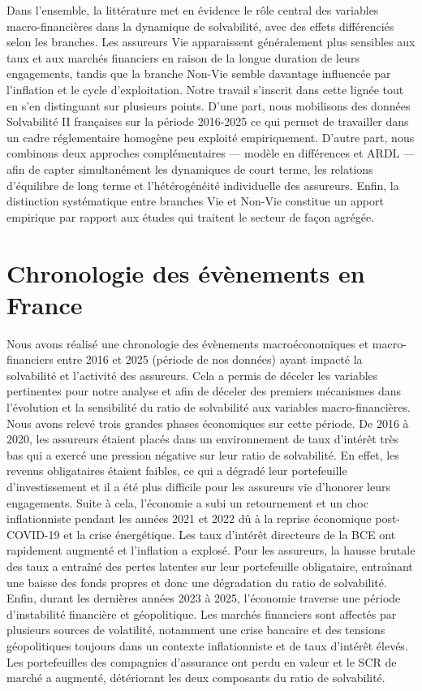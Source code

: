 \documentclass[
]{article}
\begin{document}
Dans l'ensemble, la littérature met en évidence le rôle central des
variables macro-financières dans la dynamique de solvabilité, avec des
effets différenciés selon les branches. Les assureurs Vie apparaissent
généralement plus sensibles aux taux et aux marchés financiers en raison
de la longue duration de leurs engagements, tandis que la branche
Non-Vie semble davantage influencée par l'inflation et le cycle
d'exploitation. Notre travail s'inscrit dans cette lignée tout en s'en
distinguant sur plusieurs points. D'une part, nous mobilisons des
données Solvabilité II françaises sur la période 2016-2025 ce qui permet
de travailler dans un cadre réglementaire homogène peu exploité
empiriquement. D'autre part, nous combinons deux approches
complémentaires --- modèle en différences et ARDL --- afin de capter
simultanément les dynamiques de court terme, les relations d'équilibre
de long terme et l'hétérogénéité individuelle des assureurs. Enfin, la
distinction systématique entre branches Vie et Non-Vie constitue un
apport empirique par rapport aux études qui traitent le secteur de façon
agrégée.

\section{Chronologie des évènements en
France}\label{chronologie-des-uxe9vuxe8nements-en-france}

Nous avons réalisé une chronologie des évènements macroéconomiques et
macro-financiers entre 2016 et 2025 (période de nos données) ayant
impacté la solvabilité et l'activité des assureurs. Cela a permis de
déceler les variables pertinentes pour notre analyse et afin de déceler
des premiers mécanismes dans l'évolution et la sensibilité du ratio de
solvabilité aux variables macro-financières. Nous avons relevé trois
grandes phases économiques sur cette période. De 2016 à 2020, les
assureurs étaient placés dans un environnement de taux d'intérêt très
bas qui a exercé une pression négative sur leur ratio de solvabilité. En
effet, les revenus obligataires étaient faibles, ce qui a dégradé leur
portefeuille d'investissement et il a été plus difficile pour les
assureurs vie d'honorer leurs engagements. Suite à cela, l'économie a
subi un retournement et un choc inflationniste pendant les années 2021
et 2022 dû à la reprise économique post-COVID-19 et la crise
énergétique. Les taux d'intérêt directeurs de la BCE ont rapidement
augmenté et l'inflation a explosé. Pour les assureurs, la hausse brutale
des taux a entraîné des pertes latentes sur leur portefeuille
obligataire, entraînant une baisse des fonds propres et donc une
dégradation du ratio de solvabilité. Enfin, durant les dernières années
2023 à 2025, l'économie traverse une période d'instabilité financière et
géopolitique. Les marchés financiers sont affectés par plusieurs sources
de volatilité, notamment une crise bancaire et des tensions
géopolitiques toujours dans un contexte inflationniste et de taux
d'intérêt élevés. Les portefeuilles des compagnies d'assurance ont perdu
en valeur et le SCR de marché a augmenté, détériorant les deux
composants du ratio de solvabilité.
\end{document}
